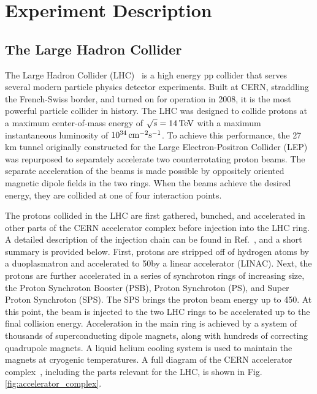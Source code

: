 \chapter{Experiment Description}\label{sec:experiment}

\section{The Large Hadron Collider}
The Large Hadron Collider (LHC)~\cite{Evans_2008} is a high energy pp collider that serves several modern particle physics detector experiments. 
Built at CERN, straddling the French-Swiss border, and turned on for operation in 2008, it is the most powerful particle collider in history. 
The LHC was designed to collide protons at a maximum center-of-mass energy of $\sqrt s = 14\,\text{Te\hspace{-.08em}V}$ 
with a maximum instantaneous luminosity of $10^{34}\,\text{cm}^{-2}\mathrm{s}^{-1}$. To achieve this performance, the 27 km tunnel 
originally constructed for the Large Electron-Positron Collider (LEP)~\cite{Myers:226776} was repurposed to separately 
accelerate two counterrotating proton beams. The separate acceleration of the beams is made possible by oppositely oriented 
magnetic dipole fields in the two rings. When the beams achieve the desired energy, they are collided at one of four interaction points. 

The protons collided in the LHC are first gathered, bunched, and accelerated in other parts of the CERN accelerator complex before injection into the LHC ring. A detailed description of the injection chain can be found in Ref.~\cite{Benedikt:2004wm}, and a short summary is provided below. 
First, protons are stripped off of hydrogen atoms by a duoplasmatron and accelerated to 50\MeV by a linear accelerator (LINAC). Next, the protons are further accelerated 
in a series of synchroton rings of increasing size, the Proton Synchroton Booster (PSB), Proton Synchroton (PS), and Super Proton Synchroton (SPS). The SPS brings the 
proton beam energy up to 450\GeV. At this point, the beam is injected to the two LHC rings to be accelerated up to the final collision energy. Acceleration in the main 
ring is achieved by a system of thousands of superconducting dipole magnets, along with hundreds of correcting quadrupole magnets. A liquid helium cooling system is 
used to maintain the magnets at cryogenic temperatures. A full diagram of the CERN accelerator complex~\cite{CERN_complex}, including the parts relevant for the LHC, is shown in Fig. \ref{fig:accelerator_complex}.

